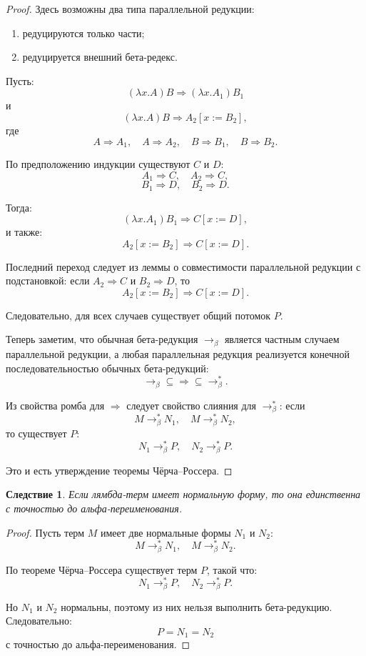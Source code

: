 \documentclass[12pt,a4paper]{article}
\newtheorem{corollary}{Следствие}
\begin{document}
\begin{proof}
Здесь возможны два типа параллельной редукции:
\begin{enumerate}
  \item редуцируются только части;
  \item редуцируется внешний бета-редекс.
\end{enumerate}

Пусть:
\[
(\lambda x.A)B \Rightarrow (\lambda x.A_1)B_1
\]
и
\[
(\lambda x.A)B \Rightarrow A_2[x := B_2],
\]
где
\[
A \Rightarrow A_1,\quad A \Rightarrow A_2,\quad
B \Rightarrow B_1,\quad B \Rightarrow B_2.
\]

По предположению индукции существуют $C$ и $D$:
\[
A_1 \Rightarrow C,\quad A_2 \Rightarrow C,
\]
\[
B_1 \Rightarrow D,\quad B_2 \Rightarrow D.
\]

Тогда:
\[
(\lambda x.A_1)B_1 \Rightarrow C[x := D],
\]
и также:
\[
A_2[x := B_2] \Rightarrow C[x := D].
\]

Последний переход следует из леммы о совместимости параллельной редукции с подстановкой:
если $A_2 \Rightarrow C$ и $B_2 \Rightarrow D$, то
\[
A_2[x := B_2] \Rightarrow C[x := D].
\]

Следовательно, для всех случаев существует общий потомок $P$.

Теперь заметим, что обычная бета-редукция $\to_\beta$ является частным случаем параллельной редукции, а любая параллельная редукция реализуется конечной последовательностью обычных бета-редукций:
\[
\to_\beta \subseteq \Rightarrow \subseteq \to_\beta^*.
\]

Из свойства ромба для $\Rightarrow$ следует свойство слияния для $\to_\beta^*$:
если
\[
M \to_\beta^* N_1,\quad M \to_\beta^* N_2,
\]
то существует $P$:
\[
N_1 \to_\beta^* P,\quad N_2 \to_\beta^* P.
\]

Это и есть утверждение теоремы Чёрча--Россера.
\end{proof}

\begin{corollary}
Если лямбда-терм имеет нормальную форму, то она единственна с точностью до альфа-переименования.
\end{corollary}

\begin{proof}
Пусть терм $M$ имеет две нормальные формы $N_1$ и $N_2$:
\[
M \to_\beta^* N_1,\quad M \to_\beta^* N_2.
\]

По теореме Чёрча--Россера существует терм $P$, такой что:
\[
N_1 \to_\beta^* P,\quad N_2 \to_\beta^* P.
\]

Но $N_1$ и $N_2$ нормальны, поэтому из них нельзя выполнить бета-редукцию. Следовательно:
\[
P = N_1 = N_2
\]
с точностью до альфа-переименования.
\end{proof}
\end{document}
